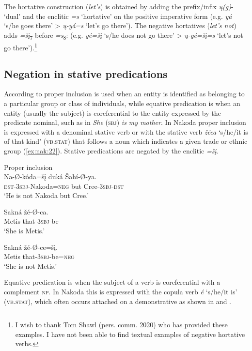 \documentclass[output=paper,colorlinks,citecolor=brown]{langscibook}
\begin{document}
The hortative construction (\textit{let’s}) is obtained by adding the prefix/infix \textit{ų(g)}- ‘dual’ and the enclitic \textit{=s} ‘hortative’ on the positive imperative form (e.g. \textit{yá} ‘s/he goes there’ > \textit{ų-yá=s} ‘let’s go there’). The negative hortatives (\textit{let’s not}) adds \textit{=šį}\textsubscript{7} before \textit{=s}\textsubscript{8}: (e.g. \textit{yé=šį} ‘s/he does not go there’ > \textit{ų-yé=šį=s} ‘let’s not go there’).\footnote{I wish to thank Tom Shawl (pers. comm. 2020) who has provided these examples. I have not been able to find textual examples of negative hortative verbs.}

\subsection{Negation in stative predications}\label{sec:nak:2.3}

According to \citet[114]{Payne1997} proper inclusion is used when an entity is identified as belonging to a particular group or class of individuals, while equative predication is when an entity (usually the subject) is coreferential to the entity expressed by the predicate nominal, such as in \textit{She} (\textsc{sbj}) \textit{is my mother}. In Nakoda proper inclusion is expressed with a denominal stative verb  or with the stative verb \textit{žéca} ‘s/he/it is of that kind’ (\textsc{vb.stat}) that follows a noun which indicates a given trade or ethnic group (\ref{ex:nak:22}). Stative predications are negated by the enclitic \textit{=šį.}

\ea\label{ex:nak:21} {Proper inclusion} \\
    \gll Na-Ø-kóda=šį duká Šahí-Ø-ya. \\
         \textsc{dst-3sbj}-Nakoda=\textsc{neg} but Cree-\textsc{3sbj-dst} \\
    \glt ‘He is not Nakoda but Cree.’
\z 

\ea\label{ex:nak:22}
    \ea\label{ex:nak:22a}
        \gll Sakná žé-Ø-ca. \\ 
             Metis that\textsc{-3sbj}-be \\
        \glt ‘She is Metis.’
    
    \ex\label{ex:nak:22b}
        \gll Sakná žé-Ø-ce=šį. \\
             Metis that\textsc{-3sbj}-be=\textsc{neg}\\
        \glt ‘She is not Metis.’
    \z
\z 

Equative predication is when the subject of a verb is coreferential with a complement \textsc{np}. In Nakoda this is expressed with the copula verb \textit{é} ‘s/he/it is’ (\textsc{vb.stat}), which often occurs attached on a demonstrative as shown in  and . 
\end{document}
